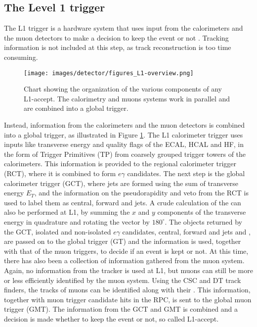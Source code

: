 \subsection*{The Level 1 trigger}
\noindent
\justify
The L1 trigger is a hardware system that uses input from the calorimeters and the muon detectors to make a decision to keep the event or not \cite{Khachatryan:2016bia}. 
Tracking information is not included at this step, as track reconstruction is too time consuming. 
\begin{figure}[!htp]
  \centering
   \texttt{[image: images/detector/figures\_L1-overview.png]}
   \caption{Chart showing the organization of the various components of any L1-accept. The calorimetry and muons systems work in parallel and are combined into a global trigger.}
   \label{fig:L1}
\end{figure}                                                                           
Instead, information from the calorimeters and the muon detectors is combined into a global trigger, as illustrated in Figure \ref{fig:L1}. 
The L1 calorimeter trigger uses inputs like transverse energy and quality flags of the ECAL, HCAL and HF, in the form of Trigger Primitives (TP) from coarsely grouped trigger towers of the calorimeters.
This information is provided to the regional calorimeter trigger (RCT), where it is combined to form $e\gamma$ candidates. 
The next step is the global calorimeter trigger (GCT), where jets are formed using the sum of transverse energy $E_{T}$, and the information on the pseudorapidity and \Tau veto from the RCT is used to label them as central, forward and \Tau jets. 
A crude calculation of the \ptmiss can also be performed at L1, by summing the $x$ and $y$ components of the transverse energy in quadrature and rotating the vector by $180^{\circ}$. 
The objects returned by the GCT, isolated and non-isolated $e\gamma$ candidates, central, forward and \Tau jets and \ptmiss, are passed on to the global trigger (GT) and the information is used, together with that of the muon triggers, to decide if an event is kept or not.   
At this time, there has also been a collection of information gathered from the muon system. 
Again, no information from the tracker is used at L1, but muons can still be more or less efficiently identified by the muon system. 
Using the CSC and DT track finders, the tracks of muons can be identified along with their \pt. 
This information, together with muon trigger candidate hits in the RPC, is sent to the global muon trigger (GMT). 
The information from the GCT and GMT is combined and a decision is made whether to keep the event or not, so called L1-accept. 
